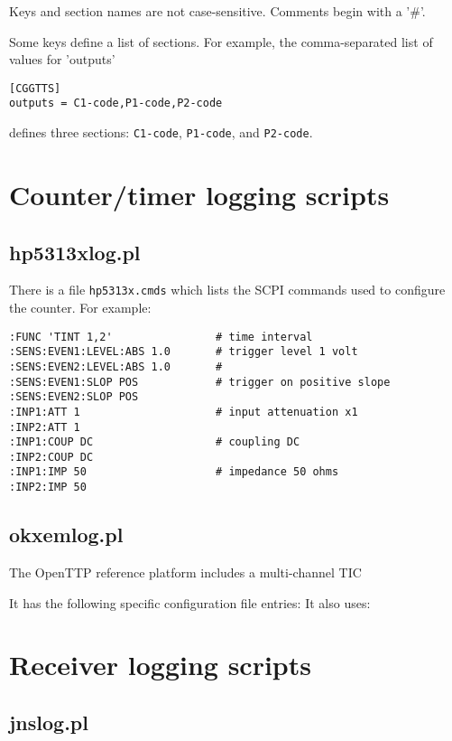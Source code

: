 \documentclass[11pt,a4paper,openany,oneside]{book}
\newcommand{\cc}[1]{{\texttt{#1}}}
\begin{document}
Keys and section names are not case-sensitive. Comments begin with a '\#'.

Some keys define a list of sections. For example, the comma-separated list of values for 'outputs' 
\begin{lstlisting}
[CGGTTS]
outputs = C1-code,P1-code,P2-code
\end{lstlisting}
defines three sections: \cc{C1-code}, \cc{P1-code}, and \cc{P2-code}.







\section{Counter/timer logging scripts}

\subsection{hp5313xlog.pl}

There is a file \cc{hp5313x.cmds} which lists the SCPI commands used to configure the counter.
For example:
\begin{lstlisting}
:FUNC 'TINT 1,2'                # time interval
:SENS:EVEN1:LEVEL:ABS 1.0       # trigger level 1 volt
:SENS:EVEN2:LEVEL:ABS 1.0       #
:SENS:EVEN1:SLOP POS            # trigger on positive slope
:SENS:EVEN2:SLOP POS
:INP1:ATT 1                     # input attenuation x1
:INP2:ATT 1
:INP1:COUP DC                   # coupling DC
:INP2:COUP DC
:INP1:IMP 50                    # impedance 50 ohms
:INP2:IMP 50
\end{lstlisting}

\subsection{okxemlog.pl}

The OpenTTP reference platform includes a multi-channel TIC

It has the following specific configuration file entries:
It also uses:

\section{Receiver logging scripts}

\subsection{jnslog.pl}
\end{document}
